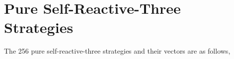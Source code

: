 \documentclass{article}
\theoremstyle{definition}
\begin{document}

\section{Pure Self-Reactive-Three Strategies}\label{section:pure_self_reactive_n3}

The 256 pure self-reactive-three strategies and their vectors are as follows,

\begin{multicols}{3}

\end{multicols}

~\\

\end{document}
